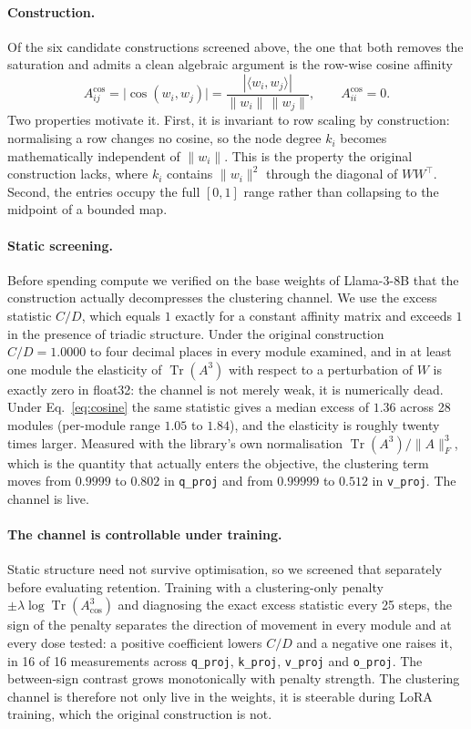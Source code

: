 \documentclass[11pt,a4paper]{article}
\begin{document}
\paragraph{Construction.} Of the six candidate constructions screened above,
the one that both removes the saturation and admits a clean algebraic argument
is the row-wise cosine affinity
\begin{equation}
A^{\cos}_{ij} = \bigl|\cos(w_i, w_j)\bigr|
= \frac{|\langle w_i, w_j\rangle|}{\lVert w_i\rVert\,\lVert w_j\rVert},
\qquad A^{\cos}_{ii} = 0 .
\label{eq:cosine}
\end{equation}
Two properties motivate it. First, it is invariant to row scaling by
construction: normalising a row changes no cosine, so the node degree
$k_i$ becomes mathematically independent of $\lVert w_i\rVert$. This is the
property the original construction lacks, where $k_i$ contains
$\lVert w_i\rVert^2$ through the diagonal of $WW^\top$. Second, the entries
occupy the full $[0,1]$ range rather than collapsing to the midpoint of a
bounded map.

\paragraph{Static screening.} Before spending compute we verified on the base
weights of Llama-3-8B that the construction actually decompresses the
clustering channel. We use the excess statistic $C/D$, which equals $1$
exactly for a constant affinity matrix and exceeds $1$ in the presence of
triadic structure. Under the original construction $C/D = 1.0000$ to four
decimal places in every module examined, and in at least one module the
elasticity of $\operatorname{Tr}(A^3)$ with respect to a perturbation of $W$
is exactly zero in float32: the channel is not merely weak, it is
numerically dead. Under Eq.~\ref{eq:cosine} the same statistic gives a median
excess of $1.36$ across 28 modules (per-module range $1.05$ to $1.84$), and
the elasticity is roughly twenty times larger. Measured with the library's own
normalisation $\operatorname{Tr}(A^3)/\lVert A\rVert_F^3$, which is the
quantity that actually enters the objective, the clustering term moves from
$0.9999$ to $0.802$ in \texttt{q\_proj} and from $0.99999$ to $0.512$ in
\texttt{v\_proj}. The channel is live.

\paragraph{The channel is controllable under training.} Static structure need
not survive optimisation, so we screened that separately before evaluating
retention. Training with a clustering-only penalty
$\pm\lambda\log\operatorname{Tr}(A^3_{\cos})$ and diagnosing the exact excess
statistic every 25 steps, the sign of the penalty separates the direction of
movement in every module and at every dose tested: a positive coefficient
lowers $C/D$ and a negative one raises it, in 16 of 16 measurements across
\texttt{q\_proj}, \texttt{k\_proj}, \texttt{v\_proj} and \texttt{o\_proj}. The
between-sign contrast grows monotonically with penalty strength. The
clustering channel is therefore not only live in the weights, it is
steerable during LoRA training, which the original construction is not.
\end{document}
